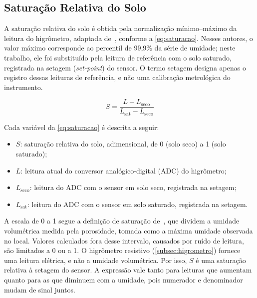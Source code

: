 \subsection{Saturação Relativa do Solo}
\label{subsec:saturacao}

A saturação relativa do solo é obtida pela normalização mínimo--máximo
da leitura do higrômetro, adaptada de~,
conforme a \autoref{eq:saturacao}. Nesses autores, o valor máximo
corresponde ao percentil de 99,9\% da série de umidade; neste
trabalho, ele foi substituído pela leitura de referência com o solo
saturado, registrada na setagem (\textit{set-point}) do sensor. O termo
setagem designa apenas o registro dessas leituras de referência, e não
uma calibração metrológica do instrumento.

\begin{equation}
\label{eq:saturacao}
S = \frac{L - L_{\mathrm{seco}}}{L_{\mathrm{sat}} - L_{\mathrm{seco}}}
\end{equation}

Cada variável da \autoref{eq:saturacao} é descrita a seguir:

\begin{itemize}
  \item $S$: saturação relativa do solo, adimensional, de 0 (solo
        seco) a 1 (solo saturado);
  \item $L$: leitura atual do conversor analógico-digital (ADC) do
        higrômetro;
  \item $L_{\mathrm{seco}}$: leitura do ADC com o sensor em solo seco,
        registrada na setagem;
  \item $L_{\mathrm{sat}}$: leitura do ADC com o sensor em solo
        saturado, registrada na setagem.
\end{itemize}

A escala de 0 a 1 segue a definição de saturação de~, que dividem a umidade
volumétrica medida pela porosidade, tomada como a máxima umidade
observada no local. Valores calculados fora desse intervalo, causados
por ruído de leitura, são limitados a 0 ou a 1.
O higrômetro resistivo (\autoref{subsec:higrometro}) fornece uma
leitura elétrica, e não a umidade volumétrica. Por isso, $S$ é uma
saturação relativa à setagem do sensor. A expressão vale tanto
para leituras que aumentam quanto para as que diminuem com a umidade,
pois numerador e denominador mudam de sinal juntos.

